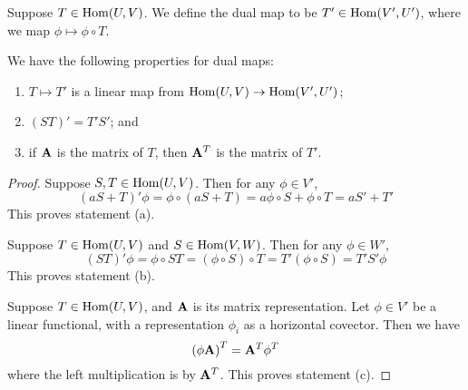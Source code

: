 \begin{definition}
    Suppose \(T \in \operatorname{Hom}(U,V)\).
    We define the dual map to be \(T' \in \operatorname{Hom}(V',U')\),
    where we map \(\phi \mapsto \phi \circ T\).
\end{definition}
\begin{proposition}
    We have the following properties for dual maps:
    \begin{enumerate}[label={(\alph*)}, itemsep=0mm]
        \item \(T \mapsto T'\) is a linear map from \(\operatorname{Hom}(U,V) \to \operatorname{Hom}(V',U')\);
        \item \({(ST)}' = T'S'\); and
        \item if \(\vb{A}\) is the matrix of \(T\), then \(\vb{A}^T\) is the matrix of \(T'\).
    \end{enumerate}
\end{proposition}
\begin{proof}
    Suppose \(S,T \in \operatorname{Hom}(U,V)\).
    Then for any \(\phi \in V'\),
    \begin{equation*}
        (aS + T)'\phi = \phi \circ (aS + T) = a\phi \circ S + \phi \circ T
        = aS' + T'
    \end{equation*}
    This proves statement (a).

    Suppose \(T \in \operatorname{Hom}(U,V)\) and \(S \in \operatorname{Hom}(V,W)\).
    Then for any \(\phi \in W'\),
    \begin{equation*}
        {(ST)}'\phi = \phi \circ ST = (\phi \circ S) \circ T
        = T'(\phi \circ S) = T'S'\phi
    \end{equation*}
    This proves statement (b).

    Suppose \(T \in \operatorname{Hom}(U,V)\), and \(\vb{A}\) is its matrix representation.
    Let \(\phi \in V'\) be a linear functional,
    with a representation \(\phi_i\) as a horizontal covector.
    Then we have
    \begin{equation*}
        \pqty{\phi\vb{A}}^T
        = \vb{A}^T\phi^T
    \end{equation*}
    where the left multiplication is by \(\vb{A}^T\).
    This proves statement (c).
\end{proof}
